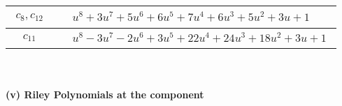 \documentclass[1p]{elsarticle_modified}
\theoremstyle{definition}
\begin{document}
\begin{tabular}{m{50pt}|m{274pt}}
\hline $$\begin{aligned}c_{8},c_{12}\end{aligned}$$&$\begin{aligned}
&u^8+3 u^7+5 u^6+6 u^5+7 u^4+6 u^3+5 u^2+3 u+1
\end{aligned}$\\
\hline $$\begin{aligned}c_{11}\end{aligned}$$&$\begin{aligned}
&u^8-3 u^7-2 u^6+3 u^5+22 u^4+24 u^3+18 u^2+3 u+1
\end{aligned}$\\
\hline
\end{tabular}\\~\\
\newpage\renewcommand{\arraystretch}{1}
\flushleft \textbf{(v) Riley Polynomials at the component}\newline \\
\end{document}
